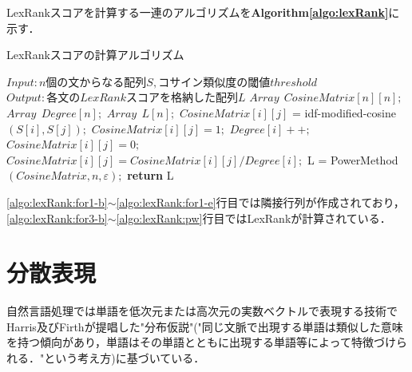 LexRankスコアを計算する一連のアルゴリズムを\textbf{Algorithm\ref{algo:lexRank}}に示す．

\begin{algorithm}
\caption{LexRankスコアの計算アルゴリズム} \label{algo:lexRank}
\begin{algorithmic}[1]
\State $Input: n 個の文からなる配列 S, コサイン類似度の閾値 threshold$
\State $Output: 各文のLexRankスコアを格納した配列L$
\State $Array ~~ CosineMatrix[n][n];$
\State $Array ~~ Degree[n];$
\State $Array ~~ L[n];$
	 \label{algo:lexRank:for1-b}
	 	\label{algo:lexRank:for2-b}
			\State $CosineMatrix[i][j]$ = idf-modified-cosine$(S[i], S[j]);$\label{algo:lexRank:cos}
				\State $CosineMatrix[i][j] = 1;$
				\State $Degree[i]++;$
			\Else
			 	\State $CosineMatrix[i][j] = 0;$
			\EndIf
		\EndFor\label{algo:lexRank:for2-e}
	 \EndFor\label{algo:lexRank:for1-e}
        \label{algo:lexRank:for3-b}
    		\label{algo:lexRank:for4-b}
         		\State $CosineMatrix[i][j] = CosineMatrix[i][j] / Degree[i];$
    		\EndFor\label{for4}\label{algo:lexRank:for4-e}
	\EndFor\label{for3}\label{algo:lexRank:for3-e}
	\State L = PowerMethod$(CosineMatrix, n, ε);$\label{algo:lexRank:pw}
	\State \textbf{return} L
\EndProcedure
\end{algorithmic}
\end{algorithm}

\ref{algo:lexRank:for1-b}$\sim$\ref{algo:lexRank:for1-e}行目では隣接行列が作成されており，\ref{algo:lexRank:for3-b}$\sim$\ref{algo:lexRank:pw}行目ではLexRankが計算されている．
\section{分散表現}
\label{rel:part:vec}
自然言語処理では単語を低次元または高次元の実数ベクトルで表現する技術でHarris\cite{harris1954distributional}及びFirth\cite{firth1957hypothesis}が提唱した"分布仮説"("同じ文脈で出現する単語は類似した意味を持つ傾向があり，単語はその単語とともに出現する単語等によって特徴づけられる．"という考え方)に基づいている．
